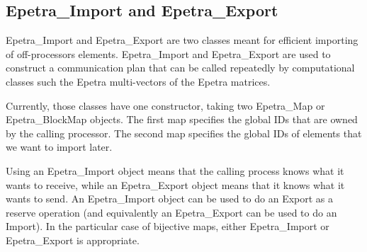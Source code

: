 
\subsection{Epetra\_Import and Epetra\_Export}
\label{sec:import_export}

Epetra\_Import and Epetra\_Export are two classes meant for efficient
importing of off-processors elements. Epetra\_Import and Epetra\_Export
are used to construct a communication plan that can be called repeatedly
by computational classes such the Epetra multi-vectors of the Epetra
matrices.

Currently, those classes have one constructor, taking two Epetra\_Map or
Epetra\_BlockMap objects. The first map specifies the global IDs that
are owned by the calling processor. The second map specifies the global
IDs of  elements that we want to import later.

Using an Epetra\_Import object means that the calling process knows what
it wants to receive, while an Epetra\_Export object means that it knows
what it wants to send. An Epetra\_Import object can be used to do an
Export as a reserve operation (and equivalently an Epetra\_Export can be
used to do an Import). In the particular case of bijective maps, either
Epetra\_Import or Epetra\_Export is appropriate.

\medskip

